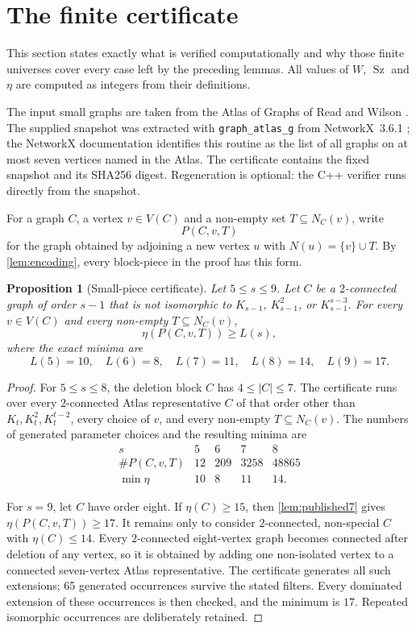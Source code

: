 \documentclass[11pt,reqno]{amsart}
\newtheorem{proposition}[proposition]{Proposition}
\theoremstyle{definition}
\theoremstyle{remark}
\newcommand{\Sz}{\operatorname{Sz}}
\begin{document}
\section{The finite certificate}\label{sec:finite}

This section states exactly what is verified computationally and why those
finite universes cover every case left by the preceding lemmas.  All values of
$W$, $\Sz$ and $\eta$ are computed as integers from their definitions.

The input small graphs are taken from the Atlas of Graphs of Read and Wilson
\cite{ReadWilson}.  The supplied snapshot was extracted with
\texttt{graph\_atlas\_g} from NetworkX~3.6.1 \cite{NetworkXAtlas}; the
NetworkX documentation identifies this routine as the list of all graphs on at
most seven vertices named in the Atlas.  The certificate contains the fixed
snapshot and its SHA256 digest.  Regeneration is optional: the C++ verifier
runs directly from the snapshot.

For a graph $C$, a vertex $v\in V(C)$ and a non-empty set
$T\subseteq N_C(v)$, write
\[
  P(C,v,T)
\]
for the graph obtained by adjoining a new vertex $u$ with
$N(u)=\{v\}\cup T$.  By \cref{lem:encoding}, every block-piece in the proof
has this form.

\begin{proposition}[Small-piece certificate]\label{prop:pieces}
Let $5\le s\le9$.  Let $C$ be a $2$-connected graph of order $s-1$ that
is not isomorphic to $K_{s-1}$, $K_{s-1}^2$, or
$K_{s-1}^{s-3}$.  For every $v\in V(C)$ and every non-empty
$T\subseteq N_C(v)$,
\[
  \eta(P(C,v,T))\ge L(s),
\]
where the exact minima are
\[
 L(5)=10,\quad L(6)=8,\quad L(7)=11,\quad L(8)=14,\quad L(9)=17.
\]
\end{proposition}

\begin{proof}
For $5\le s\le8$, the deletion block $C$ has $4\le|C|\le7$.  The certificate
runs over every $2$-connected Atlas representative $C$ of that order other
than $K_t,K_t^2,K_t^{t-2}$, every choice of $v$, and every non-empty
$T\subseteq N_C(v)$.  The numbers of generated parameter choices and the
resulting minima are
\[
\begin{array}{c|rrrr}
 s&5&6&7&8\\ \hline
 \#P(C,v,T)&12&209&3258&48865\\
 \min\eta&10&8&11&14.
\end{array}
\]

For $s=9$, let $C$ have order eight.  If $\eta(C)\ge15$, then
\cref{lem:published7} gives $\eta(P(C,v,T))\ge17$.  It remains only to
consider $2$-connected, non-special $C$ with $\eta(C)\le14$.  Every
$2$-connected eight-vertex graph becomes connected after deletion of any
vertex, so it is obtained by adding one non-isolated vertex to a connected
seven-vertex Atlas representative.  The certificate generates all such
extensions; 65 generated occurrences survive the stated filters.  Every
dominated extension of these occurrences is then checked, and the minimum is
$17$.  Repeated isomorphic occurrences are deliberately retained.
\end{proof}
\end{document}
